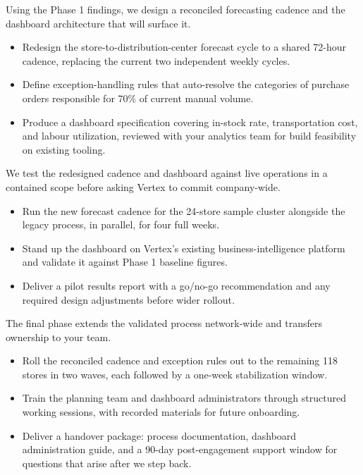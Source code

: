 \vspace{0.3cm}

Using the Phase 1 findings, we design a reconciled forecasting cadence and the
dashboard architecture that will surface it.

\begin{itemize}[leftmargin=1.4em]
  \item Redesign the store-to-distribution-center forecast cycle to a shared
    72-hour cadence, replacing the current two independent weekly cycles.
  \item Define exception-handling rules that auto-resolve the categories of
    purchase orders responsible for 70\% of current manual volume.
  \item Produce a dashboard specification covering in-stock rate,
    transportation cost, and labour utilization, reviewed with your
    analytics team for build feasibility on existing tooling.
  \end{itemize}

\vspace{0.3cm}

We test the redesigned cadence and dashboard against live operations in a
contained scope before asking Vertex to commit company-wide.

\begin{itemize}[leftmargin=1.4em]
  \item Run the new forecast cadence for the 24-store sample cluster alongside
    the legacy process, in parallel, for four full weeks.
  \item Stand up the dashboard on Vertex's existing business-intelligence
    platform and validate it against Phase 1 baseline figures.
  \item Deliver a pilot results report with a go/no-go recommendation and any
    required design adjustments before wider rollout.
  \end{itemize}

\vspace{0.3cm}

The final phase extends the validated process network-wide and transfers
ownership to your team.

\begin{itemize}[leftmargin=1.4em]
  \item Roll the reconciled cadence and exception rules out to the remaining
    118 stores in two waves, each followed by a one-week stabilization window.
  \item Train the planning team and dashboard administrators through
    structured working sessions, with recorded materials for future onboarding.
  \item Deliver a handover package: process documentation, dashboard
    administration guide, and a 90-day post-engagement support window for
    questions that arise after we step back.
  \end{itemize}
